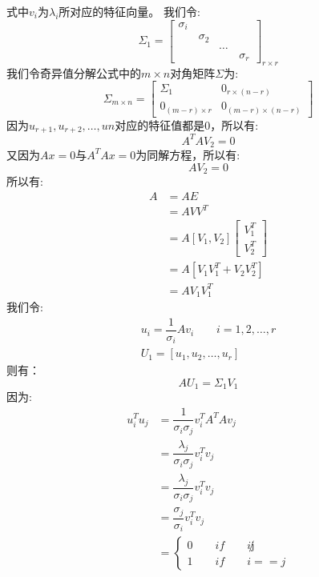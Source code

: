 \documentclass[withoutpreface,bwprint]{cumcmthesis} %
\begin{document}
	式中$v_i$为$\lambda_i$所对应的特征向量。
	我们令:
	\begin{equation}
		\Sigma_1=
		\left[
			\begin{array}{cccc}
				\sigma_i & \quad &\quad & \quad \\
				\quad & \sigma_2 & \quad & \quad \\
				\quad &  \quad & \ldots & \quad \\
				\quad &  \quad  & \quad & \sigma_r
			\end{array}
		\right]_{r \times r}
	\end{equation}
	我们令奇异值分解公式中的$m \times n$对角矩阵$\Sigma$为:
	\begin{equation}
		\Sigma_{m \times n}
		=
		\left[
			\begin{array}{cc}
				\Sigma_1  & 0_{r \times (n-r)} \\
				0_{(m-r) \times r} & 0_{(m-r) \times (n-r)}
			\end{array}
		\right]
	\end{equation}
	因为$u_{r+1},u_{r+2},\ldots,u{n}$对应的特征值都是$0$，所以有:
	\begin{equation}
		A^TAV_2=0
	\end{equation}
	又因为$Ax=0$与$A^TAx=0$为同解方程，所以有:
	\begin{equation}
		AV_2=0
	\end{equation}
	所以有:
	\begin{align*}
		A & =AE\\
		&=AVV^T\\
		&=A \left[ V_1,V_2 \right] \left[ \begin{array}{c}V_1^T\\V_2^T\end{array}\right] \\
		&=A\left[V_1V_1^T +V_2V_2^T \right]\\
		&=AV_1V_1^T
	\end{align*}
	我们令:
	\begin{align}
		u_i=\dfrac{1}{\sigma_i}Av_i \quad \quad i=1,2,\ldots,r 
		\\
		U_1=\left[u_1,u_2,\ldots,u_r \right]
	\end{align}
	则有：
	\begin{equation}
		AU_1=\Sigma_1 V_1
	\end{equation}
	因为:
	\begin{align*}
		u_i^Tu_j & =\dfrac{1}{\sigma_i \sigma_j}v_i^T A^T A v_j \\
				& =\dfrac{\lambda_j}{\sigma_i \sigma_j}  v_i^T v_j \\
				&=\dfrac{\lambda_j}{\sigma_i \sigma_j}  v_i^T v_j \\
				& =\dfrac{\sigma_j}{\sigma_i}  v_i^T v_j  \\
				&=
				\begin{cases}
					0 \quad \quad if \quad \quad i \not j\\
					1 \quad \quad if \quad \quad i==j
				\end{cases}		
	\end{align*}
\end{document}
